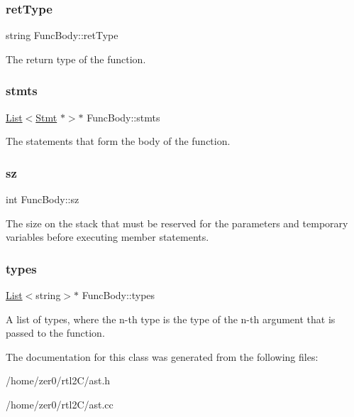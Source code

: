 \subsubsection{\texorpdfstring{ret\+Type}{retType}}
{\footnotesize\ttfamily string Func\+Body\+::ret\+Type\hspace{0.3cm}{\ttfamily [protected]}}

The return type of the function. \mbox{\label{class_func_body_a1946b17051da22b95c723dac2604b7b1}} 
\subsubsection{\texorpdfstring{stmts}{stmts}}
{\footnotesize\ttfamily \hyperlink{class_list}{List}$<$\hyperlink{class_stmt}{Stmt} $\ast$$>$$\ast$ Func\+Body\+::stmts\hspace{0.3cm}{\ttfamily [protected]}}

The statements that form the body of the function. \mbox{\label{class_func_body_a6f19667df9a4f9662fdbaec70c932394}} 
\subsubsection{\texorpdfstring{sz}{sz}}
{\footnotesize\ttfamily int Func\+Body\+::sz\hspace{0.3cm}{\ttfamily [protected]}}

The size on the stack that must be reserved for the parameters and temporary variables before executing member statements. \mbox{\label{class_func_body_ab658c76bb42d23b067c1b1860ddcf9f9}} 
\subsubsection{\texorpdfstring{types}{types}}
{\footnotesize\ttfamily \hyperlink{class_list}{List}$<$string$>$$\ast$ Func\+Body\+::types\hspace{0.3cm}{\ttfamily [protected]}}

A list of types, where the n-\/th type is the type of the n-\/th argument that is passed to the function. 

The documentation for this class was generated from the following files\+:\begin{DoxyCompactItemize}
\item 
/home/zer0/rtl2\+C/ast.\+h\item 
/home/zer0/rtl2\+C/ast.\+cc\end{DoxyCompactItemize}
